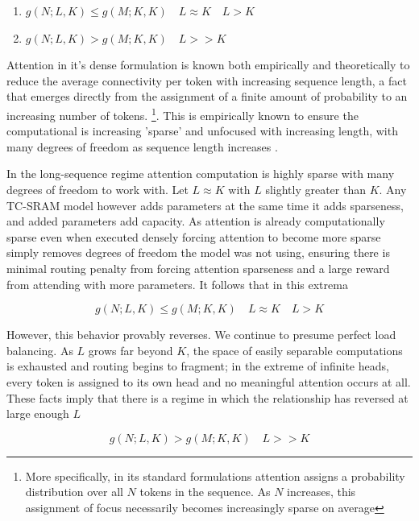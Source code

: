 \documentclass[11pt]{article}
\begin{document}
\begin{enumerate}
    \item $g(N;L,K) \leq g(M;K,K) \quad L \approx K \quad L > K$
    \item $g(N;L,K) > g(M;K,K) \quad L >> K $
\end{enumerate}

Attention in it's dense formulation is known both empirically and theoretically to reduce the average connectivity per token with increasing sequence length, a fact that emerges directly from the assignment of a finite amount of probability to an increasing number of tokens. \footnote{More specifically, in its standard formulations attention assigns a probability distribution over all $N$ tokens in the sequence. As $N$ increases, this assignment of focus necessarily becomes increasingly sparse on average}. This is empirically known to ensure the computational is increasing 'sparse' and unfocused with increasing length, with many degrees of freedom as sequence length increases \citep{vasylenko2026longcontextgeneralizationsparseattention}.

In the long-sequence regime attention computation is highly sparse with many degrees of freedom to work with. Let $L \approx K$ with $L$ slightly greater than $K$. Any TC-SRAM model however adds parameters at the same time it adds sparseness, and added parameters add capacity. As attention is already computationally sparse even when executed densely forcing attention to become more sparse simply removes degrees of freedom the model was not using, ensuring there is minimal routing penalty from forcing attention sparseness and a large reward from attending with more parameters. It follows that in this extrema

\begin{equation}
\label{equation:lower_bound}
g(N;L,K) \leq g(M;K,K) \quad L \approx K \quad L > K
\end{equation}

However, this behavior provably reverses. We continue to presume perfect load balancing. As $L$ grows far beyond $K$, the space of easily separable computations is exhausted and routing begins to fragment; in the extreme of infinite heads, every token is assigned to its own head and no meaningful attention occurs at all. These facts imply that there is a regime in which the relationship has reversed at large enough $L$

\begin{equation}
\label{equation:upper_bound}
g(N;L,K) > g(M;K,K) \quad L >> K
\end{equation}
\end{document}
